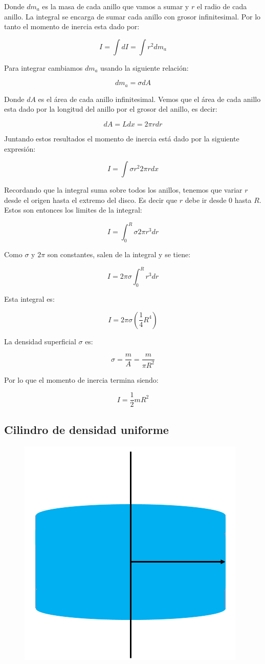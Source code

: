 \documentclass[a4paper,11pt]{article}
\theoremstyle{mytheor}
\begin{document}
Donde $dm_a$ es la masa de cada anillo que vamos a sumar y $r$ el radio de cada anillo. La integral se encarga de sumar cada anillo con grosor infinitesimal. Por lo tanto el momento de inercia esta dado por:


$$ I = \int d I  = \int r^2 dm_a $$

Para integrar cambiamos $dm_a$ usando la siguiente relación:


$$ dm_a = \sigma dA$$

Donde $dA$ es el área de cada anillo infinitesimal. Vemos que el área de cada anillo esta dado por la longitud del anillo por el grosor del anillo, es decir:

$$ dA = L dx = 2 \pi r d r$$

 Juntando estos resultados el momento de inercia está dado por la siguiente expresión:
 
$$ I = \int \sigma r^2 2 \pi r dx$$



Recordando que la integral suma sobre todos los anillos, tenemos que variar $r$ desde el origen hasta el extremo del disco. Es decir que $r$ debe ir desde $0$ hasta $R$. Estos son entonces los limites de la integral:


$$ I =  \int_{0}^{R} \sigma 2\pi   r^3 dr$$

Como $\sigma$ y $2\pi$ son constantes, salen de la integral y se tiene:

$$ I =  2\pi\sigma \int_{0}^{R}    r^3 dr$$

Esta integral es:



$$ I =  2\pi\sigma \left( \frac{1}{4} R^4\right)$$

La densidad superficial $\sigma$ es:

$$ \sigma = \frac{m}{A} = \frac{m}{\pi R^2} $$


Por lo que el momento de inercia termina siendo:

$$ I = \frac{1}{2} m R^2$$


\subsection{Cilindro de densidad uniforme}



\begin{figure}[h]
	\includegraphics[width=0.5\linewidth]{cilindro1}
	\label{fcN4}
\end{figure}
\end{document}

